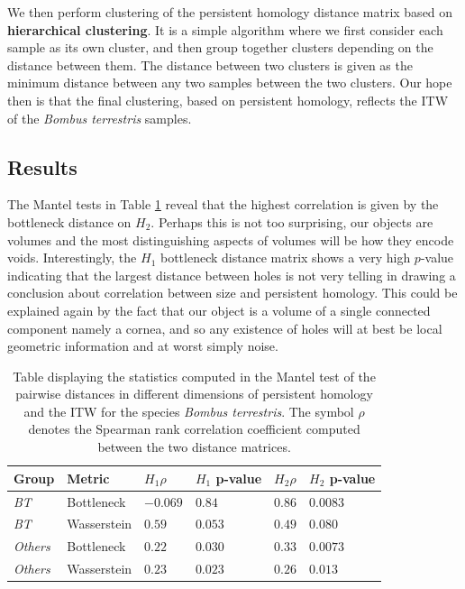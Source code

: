 We then perform clustering of the persistent homology distance matrix based on \textbf{hierarchical clustering}. It is a simple algorithm where we first consider each sample as its own cluster, and then group together clusters depending on the distance between them. The distance between two clusters is given as the minimum distance between any two samples between the two clusters. Our hope then is that the final clustering, based on persistent homology, reflects the ITW of the \textit{Bombus terrestris} samples.


\subsection{Results}
The Mantel tests in Table \ref{mantelc} reveal that the highest correlation is given by the bottleneck distance on $H_{2}$. Perhaps this is not too surprising, our objects are volumes and the most distinguishing aspects of volumes will be how they encode voids. Interestingly, the $H_{1}$ bottleneck distance matrix shows a very high $p$-value indicating that the largest distance between holes is not very telling in drawing a conclusion about correlation between size and persistent homology. This could be explained again by the fact that our object is a volume of a single connected component namely a cornea, and so any existence of holes will at best be local geometric information and at worst simply noise.

\begin{table}[h]
\begin{center}

\begin{tabular}{*6l}    \toprule
Group  & Metric  & $H_{1} \rho $  & $H_{1}$ p-value  & $H_{2} \rho$ & $H_{2}$ p-value  \\ \midrule
\textit{BT} & Bottleneck & $-0.069$ & $0.84$ & $0.86$ & $0.0083$\\
\textit{BT} & Wasserstein & $0.59 $ & $0.053 $ & $0.49$ & $0.080$\\
\textit{Others}& Bottleneck & $0.22$ & $0.030$ & $0.33$ & $0.0073$\\
\textit{Others}& Wasserstein & $0.23$ & $0.023$ & $0.26$ & $0.013$\\\bottomrule
 \hline
\end{tabular}
\end{center}

\caption{\label{mantelc} Table displaying the statistics computed in the Mantel test of the pairwise distances in different dimensions of persistent homology and the ITW for the species \textit{Bombus terrestris}. The symbol $\rho$ denotes the Spearman rank correlation coefficient computed between the two distance matrices. }
\end{table}

